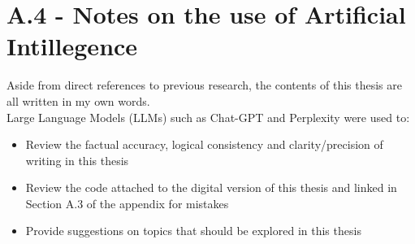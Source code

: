 \documentclass[12pt]{article}
\begin{document}
\section*{A.4 - Notes on the use of Artificial Intillegence}
Aside from direct references to previous research, the contents of this thesis are all written in my own words.\\
Large Language Models (LLMs) such as Chat-GPT and Perplexity were used to:
\begin{itemize}
\item Review the factual accuracy, logical consistency and clarity/precision of writing in this thesis
\item Review the code attached to the digital version of this thesis and linked in Section A.3 of the appendix for mistakes
\item Provide suggestions on topics that should be explored in this thesis
\end{itemize}
\end{document}
